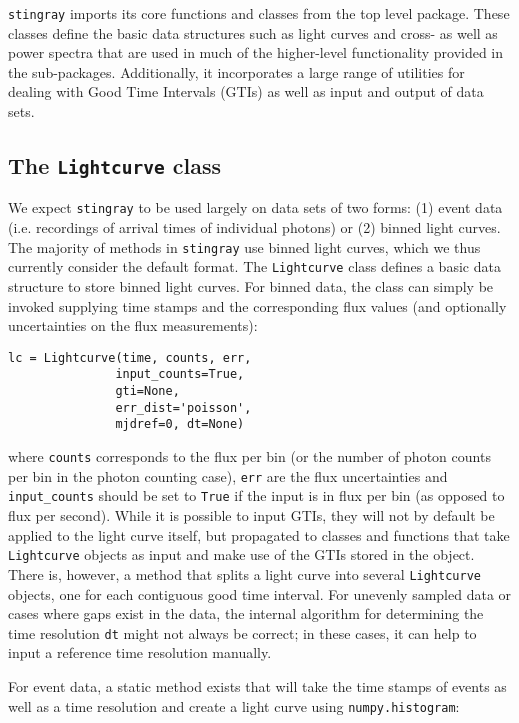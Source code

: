 \documentclass[12pt]{emulateapj}
\newcommand{\stingray}{\texttt{stingray}\xspace}
\newcommand{\lightcurve}{\texttt{Lightcurve}\xspace}
\begin{document}
\stingray imports its core functions and classes from the top level package. 
These classes define the basic data structures such as light curves and cross- as well as power spectra that are used in much of the higher-level functionality provided in the sub-packages. 
Additionally, it incorporates a large range of utilities for dealing with Good Time Intervals (GTIs) as well as input and output of data sets. 

\subsection{The \texttt{Lightcurve} class}
\label{sec:lightcurve}

We expect \stingray to be used largely on data sets of two forms: (1) event data (i.e. recordings of arrival times of individual photons) or (2) binned light curves. 
The majority of methods in \stingray use binned light curves, which we thus currently consider the default format. The \lightcurve class defines a basic data structure to store binned light curves. For binned data, the class can simply be invoked supplying time stamps and the corresponding flux values (and optionally uncertainties on the flux measurements):

\begin{verbatim}
lc = Lightcurve(time, counts, err, 
		       input_counts=True, 
		       gti=None, 
		       err_dist='poisson', 
		       mjdref=0, dt=None)
\end{verbatim}

where \texttt{counts} corresponds to the flux per bin (or the number of photon counts per bin in the photon counting case), \texttt{err} are the flux uncertainties and \verb|input_counts| should be set to \texttt{True} if the input is in flux per bin (as opposed to flux per second). While it is possible to input GTIs, they will not by default be applied to the light curve itself, but propagated to classes and functions that take \lightcurve objects as input and make use of the GTIs stored in the object. There is, however, a method that splits a light curve into several \lightcurve objects, one for each contiguous good time interval. For unevenly sampled data or cases where gaps exist in the data, the internal algorithm for determining the time resolution \texttt{dt} might not always be correct; in these cases, it can help to input a reference time resolution manually.

For event data, a static method exists that will take the time stamps of events as well as a time resolution and create a light curve using \texttt{numpy.histogram}:
\end{document}
